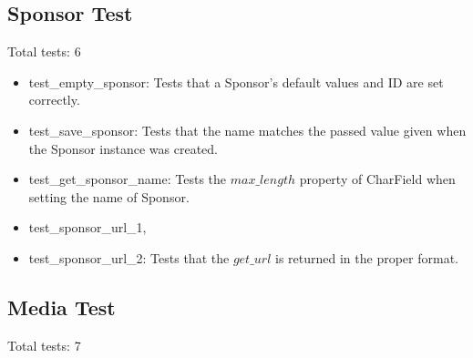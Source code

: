 \documentclass[12pt,english]{scrartcl}
\begin{document}
\subsection{Sponsor Test} 
Total tests: 6
\begin{itemize}
\item test\_empty\_sponsor: Tests that a Sponsor's default values and ID are set correctly.
 
\item test\_save\_sponsor: Tests that the name matches the passed value given when the Sponsor instance was created.  
 
\item test\_get\_sponsor\_name: Tests the $max\_length$ property of CharField when setting the name of Sponsor.

\item test\_sponsor\_url\_1, \item test\_sponsor\_url\_2: Tests that the $get\_url$ is returned in the proper format.
\end{itemize}

\subsection{Media Test}

Total tests: 7

\end{document}
